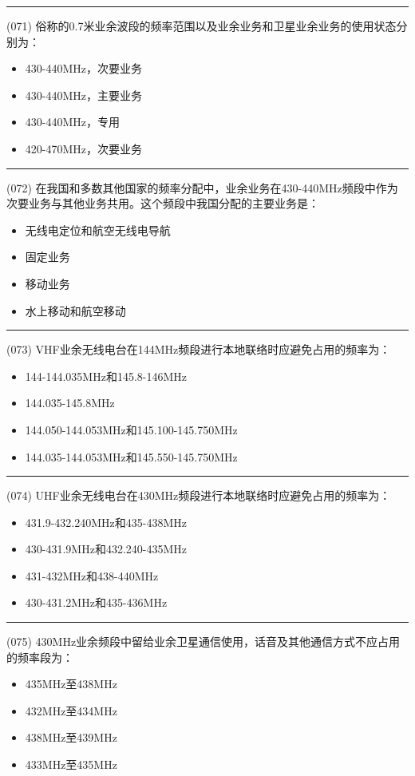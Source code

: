 \documentclass[twocolumn]{ctexart}  %
\begin{document}
\noindent\rule{0.5\textwidth}{1pt}
\heiti (071) 俗称的0.7米业余波段的频率范围以及业余业务和卫星业余业务的使用状态分别为： \songti {\color{gray} [LK0159] }
\begin{itemize}
	\item  430-440MHz，次要业务
	\item  430-440MHz，主要业务
	\item  430-440MHz，专用
	\item  420-470MHz，次要业务
\end{itemize}


\noindent\rule{0.5\textwidth}{1pt}
\heiti (072) 在我国和多数其他国家的频率分配中，业余业务在430-440MHz频段中作为次要业务与其他业务共用。这个频段中我国分配的主要业务是： \songti {\color{gray} [LK0160] }
\begin{itemize}
	\item  无线电定位和航空无线电导航
	\item  固定业务
	\item  移动业务
	\item  水上移动和航空移动
\end{itemize}


\noindent\rule{0.5\textwidth}{1pt}
\heiti (073) VHF业余无线电台在144MHz频段进行本地联络时应避免占用的频率为： \songti {\color{gray} [LK0171] }
\begin{itemize}
	\item  144-144.035MHz和145.8-146MHz
	\item  144.035-145.8MHz
	\item  144.050-144.053MHz和145.100-145.750MHz
	\item  144.035-144.053MHz和145.550-145.750MHz
\end{itemize}


\noindent\rule{0.5\textwidth}{1pt}
\heiti (074) UHF业余无线电台在430MHz频段进行本地联络时应避免占用的频率为： \songti {\color{gray} [LK0172] }
\begin{itemize}
	\item  431.9-432.240MHz和435-438MHz
	\item  430-431.9MHz和432.240-435MHz
	\item  431-432MHz和438-440MHz
	\item  430-431.2MHz和435-436MHz
\end{itemize}


\noindent\rule{0.5\textwidth}{1pt}
\heiti (075) 430MHz业余频段中留给业余卫星通信使用，话音及其他通信方式不应占用的频率段为： \songti {\color{gray} [LK1031] }
\begin{itemize}
	\item  435MHz至438MHz
	\item  432MHz至434MHz
	\item  438MHz至439MHz
	\item  433MHz至435MHz
\end{itemize}
\end{document}
